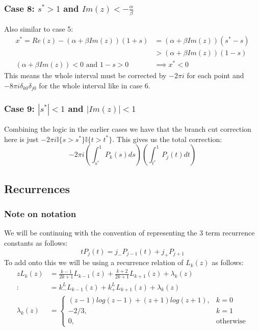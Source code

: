 \documentclass{article}
\begin{document}
\subsubsection{Case 8:  $s^*>1$ and $Im(z)<-\frac{\alpha}{\beta}$}
Also similar to case 5:
\begin{align}
    x^*=Re(z)-(\alpha+\beta Im(z))(1+s)&=(\alpha+\beta Im(z))(s^*-s)\\
    &>(\alpha+\beta Im(z))(1-s)\\
    (\alpha+\beta Im(z))<0 \text{ and } 1-s>0 &\implies x^*<0
\end{align}
This means the whole interval must be corrected by $-2\pi i$ for each point and $-8\pi i\delta_{k0}\delta_{j0}$ for the whole interval like in case 6.

\subsubsection{Case 9: $|s^*|<1$ and $|Im(z)|<1$}
Combining the logic in the earlier cases we have that the branch cut correction here is just $-2\pi i\mathbb{I}\{s>s^*\}\mathbb{I}\{t>t^*\}$.
This gives us the total correction:
$$-2\pi i(\int_{s^*}^1P_k(s)ds)(\int_{t^*}^1P_j(t)dt)$$

\subsection{Recurrences}
\subsubsection{Note on notation}
We will be continuing with the convention of representing the 3 term recurrence constants as follows:
$$tP_j(t)=j_-P_{j-1}(t)+j_+P_{j+1}$$
To add onto this we will be using a recurrence relation of $L_k(z)$ as follows:
\begin{align}
    zL_k(z) &= \frac{k-1}{2k+1}L_{k-1}(z)+\frac{k+2}{2k+1}L_{k+1}(z)+\lambda_k(z)\\
    :&= k_-^LL_{k-1}(z)+k_+^LL_{k+1}(z)+\lambda_k(z)\\
    \lambda_k(z) &= \begin{cases}
	(z-1)log(z-1)+(z+1)log(z+1),&k=0\\
	-2/3,&k=1\\
	0,&\text{otherwise}
    \end{cases}
\end{align}
\end{document}
